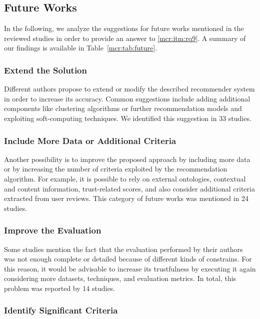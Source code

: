\subsection{Future Works}
\label{mcr:sec:future}

In the following, we analyze the suggestions for future works mentioned in the reviewed studies in order to provide an answer to \ref{mcr:itm:rq9}. A summary of our findings is available in Table~\ref{mcr:tab:future}.

\subsubsection{Extend the Solution}

Different authors propose to extend or modify the described recommender system in order to increase its accuracy. Common suggestions include adding additional components like clustering algorithms or further recommendation models and exploiting soft-computing techniques. We identified this suggestion in 33 studies.

\subsubsection{Include More Data or Additional Criteria}

Another possibility is to improve the proposed approach by including more data or by increasing the number of criteria exploited by the recommendation algorithm. For example, it is possible to rely on external ontologies, contextual and content information, trust-related scores, and also consider additional criteria extracted from user reviews. This category of future works was mentioned in 24 studies.

\subsubsection{Improve the Evaluation}

Some studies mention the fact that the evaluation performed by their authors was not enough complete or detailed because of different kinds of constrains. For this reason, it would be advisable to increase its trustfulness by executing it again considering more datasets, techniques, and evaluation metrics. In total, this problem was reported by 14 studies.

\subsubsection{Identify Significant Criteria}

